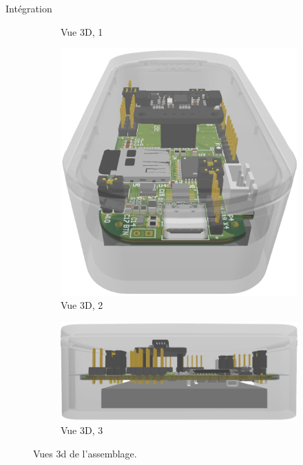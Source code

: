 \documentclass{beamer}
\begin{document}
\begin{frame}{Intégration}
\begin{figure}[!h]
\begin{subfigure}[b]{0.24\textwidth}
			\caption{Vue 3D, 1}
			\label{fig:3d-1}
		\end{subfigure}
		\hfill
		\begin{subfigure}[b]{0.33\textwidth}
			\centering
			\includegraphics[width=\textwidth]{../figures/dev-pcb/3d-view2}
			\caption{Vue 3D, 2}
			\label{fig:3d-2}
		\end{subfigure}
		\hfill
		\begin{subfigure}[b]{0.36\textwidth}
			\centering
			\includegraphics[width=\textwidth]{../figures/dev-pcb/3d-view1}
			\caption{Vue 3D, 3}
			\label{fig:3d-3}
		\end{subfigure}
		\caption{Vues 3d de l'assemblage.}
		\label{fig:MechAssembly}
	\end{figure}
\end{frame}
\end{document}

